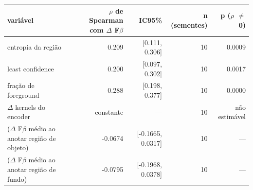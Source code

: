 \begin{tabular}{lrrrr}
\hline
variável & $\rho$ de Spearman com $\Delta$ F$\beta$ & IC95\% & n (sementes) & p ($\rho$ $\neq$ 0) \\
\hline
entropia da região & 0.209 & [0.111, 0.306] & 10 & 0.0009 \\
least confidence & 0.200 & [0.097, 0.302] & 10 & 0.0017 \\
fração de foreground & 0.288 & [0.198, 0.377] & 10 & 0.0000 \\
$\Delta$ kernels do encoder & constante & --- & 10 & não estimável \\
($\Delta$ F$\beta$ médio ao anotar região de objeto) & -0.0674 & [-0.1665, 0.0317] & 10 & --- \\
($\Delta$ F$\beta$ médio ao anotar região de fundo) & -0.0795 & [-0.1968, 0.0378] & 10 & --- \\
\hline
\end{tabular}
